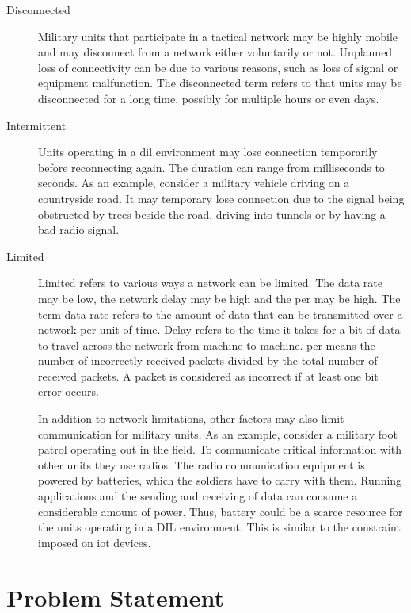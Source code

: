 \begin{description}
\item[Disconnected]

Military units that participate in a tactical network may be highly mobile and
may disconnect from a network either voluntarily or not. Unplanned loss of
connectivity can be due to various reasons, such as loss of signal or equipment
malfunction.  The disconnected term refers to that units may be disconnected for
a long time, possibly for multiple hours or even days.

\item[Intermittent]

Units operating in a \gls{dil} environment may lose connection temporarily before
reconnecting again. The duration can range from milliseconds to seconds. As an
example, consider a military vehicle driving on a countryside road. It may
temporary lose connection due to the signal being obstructed by trees beside
the road, driving into tunnels or by having a bad radio signal.

\item[Limited] Limited refers to various ways a network can be limited. The data
rate may be low, the network delay may be high and the \gls{per} may be high.
The term data rate refers to the amount of data that can be transmitted over a
network per unit of time. Delay refers to the time it takes for a bit of data to
travel across the network from machine to machine. \gls{per} means the number of
incorrectly received packets divided by the total number of received packets. A
packet is considered as incorrect if at least one bit error occurs.

In addition to network limitations, other factors may also limit communication
for military units. As an example, consider a military foot patrol operating out
in the field. To communicate critical information with other units they use
radios. The radio communication equipment is powered by batteries, which the
soldiers have to carry with them. Running applications and the sending and
receiving of data can consume a considerable amount of power. Thus, battery
could be a scarce resource for the units operating in a DIL environment. This is
similar to the constraint imposed on \gls{iot} devices.

\end{description}


\section{Problem Statement}
\label{section:problem-statement}

